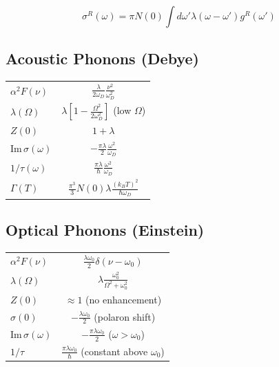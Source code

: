 \documentclass[12pt]{article}
\begin{document}
\begin{equation}
\sigma^R(\omega) = \pi N(0) \int d\omega' \lambda(\omega - \omega') g^R(\omega')
\end{equation}

\subsection{Acoustic Phonons (Debye)}

\begin{center}
\begin{tabular}{|l|c|}
\hline
$\alpha^2F(\nu)$ & $\displaystyle\frac{\lambda}{2\omega_D}\frac{\nu^2}{\omega_D^2}$ \\[0.3cm]
$\lambda(\Omega)$ & $\displaystyle\lambda\left[1 - \frac{\Omega^2}{2\omega_D^2}\right]$ (low $\Omega$) \\[0.3cm]
$Z(0)$ & $1 + \lambda$ \\[0.3cm]
$\text{Im}\,\sigma(\omega)$ & $\displaystyle-\frac{\pi\lambda}{2}\frac{\omega^2}{\omega_D}$ \\[0.3cm]
$1/\tau(\omega)$ & $\displaystyle\frac{\pi\lambda}{\hbar}\frac{\omega^2}{\omega_D}$ \\[0.3cm]
$\Gamma(T)$ & $\displaystyle\frac{\pi^3}{3}N(0)\lambda\frac{(k_BT)^2}{\hbar\omega_D}$ \\[0.3cm]
\hline
\end{tabular}
\end{center}

\subsection{Optical Phonons (Einstein)}

\begin{center}
\begin{tabular}{|l|c|}
\hline
$\alpha^2F(\nu)$ & $\displaystyle\frac{\lambda\omega_0}{2}\delta(\nu - \omega_0)$ \\[0.3cm]
$\lambda(\Omega)$ & $\displaystyle\lambda\frac{\omega_0^2}{\Omega^2 + \omega_0^2}$ \\[0.3cm]
$Z(0)$ & $\approx 1$ (no enhancement) \\[0.3cm]
$\sigma(0)$ & $\displaystyle-\frac{\lambda\omega_0}{2}$ (polaron shift) \\[0.3cm]
$\text{Im}\,\sigma(\omega)$ & $\displaystyle-\frac{\pi\lambda\omega_0}{2}$ ($\omega > \omega_0$) \\[0.3cm]
$1/\tau$ & $\displaystyle\frac{\pi\lambda\omega_0}{\hbar}$ (constant above $\omega_0$) \\[0.3cm]
\hline
\end{tabular}
\end{center}
\end{document}
